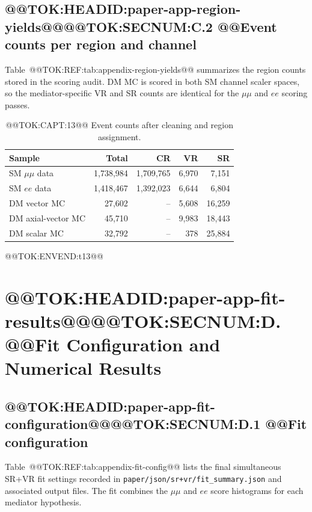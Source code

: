 \documentclass[11pt]{article}
\begin{document}
\subsection{@@TOK:HEADID:paper-app-region-yields@@@@TOK:SECNUM:C.2 @@Event counts per region and channel}

Table~@@TOK:REF:tab:appendix-region-yields@@ summarizes the region counts stored in the scoring
audit. DM MC is scored in both SM channel scaler spaces, so the mediator-specific VR and
SR counts are identical for the \(\mu\mu\) and \(ee\) scoring passes.

\begin{table}[h]
\centering
\small
\caption{@@TOK:CAPT:13@@ Event counts after cleaning and region assignment.}
\label{tab:appendix-region-yields}

\begin{tabular}{lrrrr}
\toprule
Sample & Total & CR & VR & SR \\
\midrule
SM \(\mu\mu\) data & 1,738,984 & 1,709,765 & 6,970 & 7,151 \\
SM \(ee\) data & 1,418,467 & 1,392,023 & 6,644 & 6,804 \\
DM vector MC & 27,602 & -- & 5,608 & 16,259 \\
DM axial-vector MC & 45,710 & -- & 9,983 & 18,443 \\
DM scalar MC & 32,792 & -- & 378 & 25,884 \\
\bottomrule
\end{tabular}

@@TOK:ENVEND:t13@@\end{table}


\section{@@TOK:HEADID:paper-app-fit-results@@@@TOK:SECNUM:D. @@Fit Configuration and Numerical Results}

\subsection{@@TOK:HEADID:paper-app-fit-configuration@@@@TOK:SECNUM:D.1 @@Fit configuration}

Table~@@TOK:REF:tab:appendix-fit-config@@ lists the final simultaneous SR+VR fit settings
recorded in \texttt{paper/json/sr+vr/fit\_summary.json} and associated output files.
The fit combines the \(\mu\mu\) and \(ee\) score histograms for each mediator hypothesis.
\end{document}
